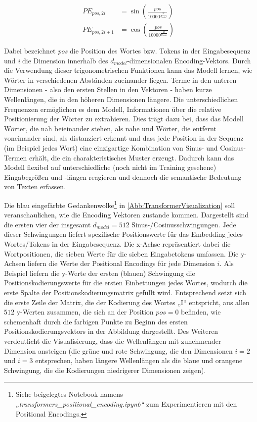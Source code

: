 \begin{equation}\label{eq:PosEncode}
	\begin{aligned}
		PE_{pos,2i} &= \sin\left(\frac{pos}{10000^{\frac{2i}{d_{model}}}}\right)\\
		PE_{pos,2i+1} &= \cos\left(\frac{pos}{10000^{\frac{2i}{d_{model}}}}\right)
	\end{aligned}
\end{equation}

Dabei bezeichnet \emph{pos} die Position des Wortes bzw. Tokens in der Eingabesequenz und \emph{i} die Dimension innerhalb des $d_{model}$-dimensionalen Encoding-Vektors. Durch die Verwendung dieser trigonometrischen Funktionen kann das Modell lernen, wie Wörter in verschiedenen Abständen zueinander liegen. Terme in den unteren Dimensionen - also den ersten Stellen in den Vektoren - haben kurze Wellenlängen, die in den höheren Dimensionen längere. Die unterschiedlichen Frequenzen ermöglichen es dem Modell, Informationen über die relative Positionierung der Wörter zu extrahieren. Dies trägt dazu bei, dass das Modell Wörter, die nah beieinander stehen, als nahe und Wörter, die entfernt voneinander sind, als distanziert erkennt und dass jede Position in der Sequenz (im Beispiel jedes Wort) eine einzigartige Kombination von Sinus- und Cosinus-Termen erhält, die ein charakteristisches Muster erzeugt. Dadurch kann das Modell flexibel auf unterschiedliche (noch nicht im Training gesehene) Eingabegrößen und -längen reagieren und dennoch die semantische Bedeutung von Texten erfassen. 

Die blau eingefärbte Gedankenwolke\footnote{Siehe beigelegtes Notebook namens \emph{„transformers\_positional\_encoding.ipynb“} zum Experimentieren mit den Positional Encodings.} in \cref{Abb:TransformerVisualization} soll veranschaulichen, wie die Encoding Vektoren zustande kommen. Dargestellt sind die ersten vier der insgesamt $d_{model}=512$ Sinus-/Cosinusschwingungen. Jede dieser Schwingungen liefert spezifische Positionswerte für das Embedding jedes Wortes/Tokens in der Eingabesequenz. Die x-Achse repräsentiert dabei die Wortpositionen, die sieben Werte für die sieben Eingabetokens umfassen. Die y-Achsen liefern die Werte der Positional Encodings für jede Dimension $i$. Als Beispiel liefern die y-Werte der ersten (blauen) Schwingung die Positionskodierungswerte für die ersten Einbettungen jedes Wortes, wodurch die erste Spalte der Positionskodierungsmatrix gefüllt wird. Entsprechend setzt sich die erste Zeile der Matrix, die der Kodierung des Wortes „I“ entspricht, aus allen $512$ y-Werten zusammen, die sich an der Position $pos=0$ befinden, wie schemenhaft durch die farbigen Punkte zu Beginn des ersten Positionskodierungsvektors in der Abbildung dargestellt. Des Weiteren verdeutlicht die Visualisierung, dass die Wellenlängen mit zunehmender Dimension ansteigen (die grüne und rote Schwingung, die den Dimensionen $i=2$ und $i=3$ entsprechen, haben längere Wellenlängen als die blaue und orangene Schwingung, die die Kodierungen niedrigerer Dimensionen zeigen).

